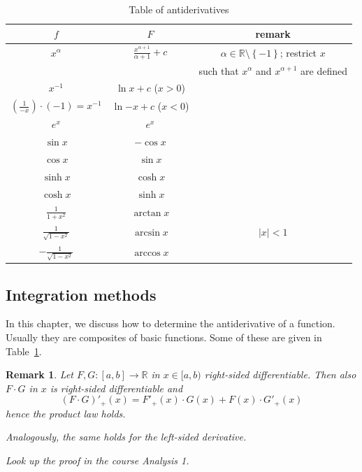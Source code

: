 \documentclass{article}
\newtheorem{remark}{Remark}  \numberwithin{remark}{section}
\newcommand{\set}[1]{\left\{#1\right\}}
\newcommand{\card}[1]{\left|#1\right|}
\begin{document}
\begin{table}[!h]
  \begin{center}
    \begin{tabular}{c|c|c}
      $f$ & $F$ & remark \\
    \hline
      $x^\alpha$ & $\frac{x^{\alpha+1}}{\alpha + 1} + c$ & $\alpha \in \mathbb R \setminus \set{-1}$; restrict $x$ \\
        & & such that $x^\alpha$ and $x^{\alpha+1}$ are defined \\
      $x^{-1}$ & $\ln{x} + c$ ($x > 0$) & \\
      $\left(\frac1{-x}\right) \cdot (-1) = x^{-1}$ & $\ln{-x} + c$ ($x < 0$) & \\
      $e^x$ & $e^x$ & \\
      $\sin{x}$ & $-\cos{x}$ & \\
      $\cos{x}$ & $\sin{x}$ & \\
      $\sinh{x}$ & $\cosh{x}$ & \\
      $\cosh{x}$ & $\sinh{x}$ & \\
      $\frac{1}{1 + x^2}$ & $\arctan x$ \\
      $\frac{1}{\sqrt{1 - x^2}}$ & $\arcsin{x}$ & $\card{x} < 1$ \\
      $-\frac{1}{\sqrt{1 - x^2}}$ & $\arccos{x}$ &
    \end{tabular}
  \end{center}
  \caption{Table of antiderivatives}
  \label{tbl:antideriv}
\end{table}

\subsection{Integration methods}

In this chapter, we discuss how to determine the antiderivative of a function.
Usually they are composites of basic functions. Some of these are given in Table~\ref{tbl:antideriv}.

\begin{remark}
  Let $F, G: [a,b] \to \mathbb R$ in $x \in [a,b)$ right-sided differentiable.
  Then also $F \cdot G$ in $x$ is right-sided differentiable and
  \[ (F \cdot G)'_+(x) = F'_+(x) \cdot G(x) + F(x) \cdot G'_+(x) \]
  hence the product law holds.

  Analogously, the same holds for the left-sided derivative.

  Look up the proof in the course Analysis 1.
\end{remark}
\end{document}
